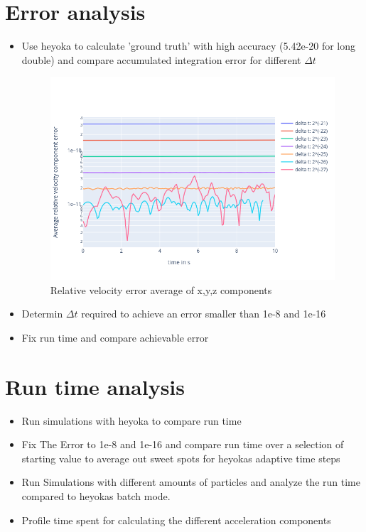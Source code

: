 \documentclass[11pt,
               a4paper,
               bibtotoc,
               idxtotoc,
               headsepline,
               footsepline,
               footexclude,
               BCOR12mm,
               DIV13,
               openany,   %
               ]
               {scrbook}
\begin{document}
\chapter{Error analysis}
    \begin{itemize}
        \item Use heyoka to calculate 'ground truth' with high accuracy (5.42e-20 for long double) and compare accumulated integration error for different \(\Delta  t\)
        \begin{figure}[H] %
            \centering
            \includegraphics[width=.9\columnwidth]{figures/rel_err_short_2.png}
            \caption[Relative velocity error]{Relative velocity error average of x,y,z components}
            \label{fig:rel_err}
        \end{figure}
        \item Determin \(\Delta t\) required to achieve an error smaller than 1e-8 and 1e-16
        \item Fix run time and compare achievable error
    \end{itemize}

\chapter{Run time analysis}
    \begin{itemize}
        \item Run simulations with heyoka to compare run time
        \item Fix The Error to 1e-8 and 1e-16 and compare run time over a selection of starting value to average out sweet spots for heyokas adaptive time steps
        \item Run Simulations with different amounts of particles and analyze the run time compared to heyokas batch mode.
        \item Profile time spent for calculating the different acceleration components
    \end{itemize}
\end{document}
